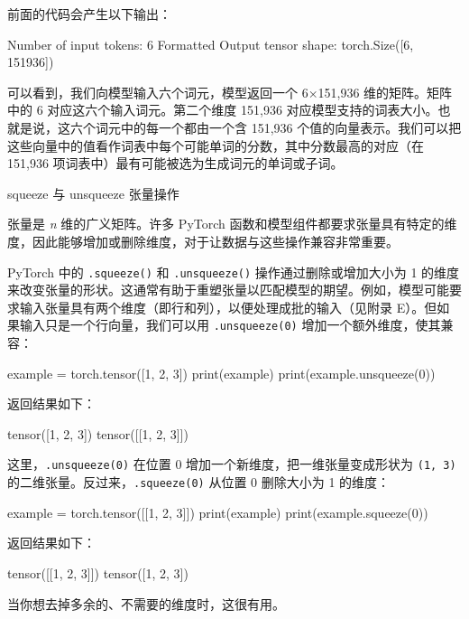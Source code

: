 前面的代码会产生以下输出：

\begin{codebox}
Number of input tokens: 6
Formatted Output tensor shape: torch.Size([6, 151936])
\end{codebox}

可以看到，我们向模型输入六个词元，模型返回一个 6×151,936 维的矩阵。矩阵中的 6 对应这六个输入词元。第二个维度 151,936 对应模型支持的词表大小。也就是说，这六个词元中的每一个都由一个含 151,936 个值的向量表示。我们可以把这些向量中的值看作词表中每个可能单词的分数，其中分数最高的对应（在 151,936 项词表中）最有可能被选为生成词元的单词或子词。

\begin{mySidebar}{squeeze 与 unsqueeze 张量操作}

张量是 \emph{n} 维的广义矩阵。许多 PyTorch 函数和模型组件都要求张量具有特定的维度，因此能够增加或删除维度，对于让数据与这些操作兼容非常重要。

PyTorch 中的 \texttt{.squeeze()} 和 \texttt{.unsqueeze()} 操作通过删除或增加大小为 1 的维度来改变张量的形状。这通常有助于重塑张量以匹配模型的期望。例如，模型可能要求输入张量具有两个维度（即行和列），以便处理成批的输入（见附录 E）。但如果输入只是一个行向量，我们可以用 \texttt{.unsqueeze(0)} 增加一个额外维度，使其兼容：

\begin{codebox}
example = torch.tensor([1, 2, 3])
print(example)
print(example.unsqueeze(0))
\end{codebox}

返回结果如下：

\begin{codebox}
tensor([1, 2, 3])
tensor([[1, 2, 3]])
\end{codebox}

这里，\texttt{.unsqueeze(0)} 在位置 0 增加一个新维度，把一维张量变成形状为 \texttt{(1, 3)} 的二维张量。反过来，\texttt{.squeeze(0)} 从位置 0 删除大小为 1 的维度：

\begin{codebox}
example = torch.tensor([[1, 2, 3]])
print(example)
print(example.squeeze(0))
\end{codebox}

返回结果如下：

\begin{codebox}
tensor([[1, 2, 3]])
tensor([1, 2, 3])
\end{codebox}

当你想去掉多余的、不需要的维度时，这很有用。

\end{mySidebar}


